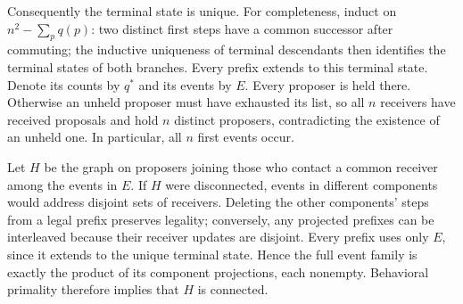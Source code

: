 \documentclass[11pt]{article}
\begin{document}
Consequently the terminal state is unique. For completeness, induct on
$n^2-\sum_p q(p)$: two distinct first steps have a common successor after
commuting; the inductive uniqueness of terminal descendants then
identifies the terminal states of both branches. Every prefix extends to
this terminal state. Denote its counts by $q^*$ and its events by $E$.
Every proposer is held there. Otherwise an unheld proposer must have
exhausted its list, so all $n$ receivers have received proposals and hold
$n$ distinct proposers, contradicting the existence of an unheld one.
In particular, all $n$ first events occur.

Let $H$ be the graph on proposers joining those who contact a common
receiver among the events in $E$. If $H$ were disconnected, events in
different components would address disjoint sets of receivers. Deleting
the other components' steps from a legal prefix preserves legality;
conversely, any projected prefixes can be interleaved because their
receiver updates are disjoint. Every prefix uses only $E$, since it
extends to the unique terminal state. Hence the full event family is
exactly the product of its component projections, each nonempty.
Behavioral primality therefore implies that $H$ is connected.
\end{document}
